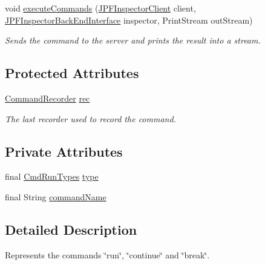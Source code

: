 \begin{DoxyCompactItemize}
void \hyperlink{interfacegov_1_1nasa_1_1jpf_1_1inspector_1_1client_1_1_client_command_interface_a6cf0905afd7822cee3268e286a7dcdd0}{execute\+Commands} (\hyperlink{classgov_1_1nasa_1_1jpf_1_1inspector_1_1client_1_1_j_p_f_inspector_client}{J\+P\+F\+Inspector\+Client} client, \hyperlink{interfacegov_1_1nasa_1_1jpf_1_1inspector_1_1interfaces_1_1_j_p_f_inspector_back_end_interface}{J\+P\+F\+Inspector\+Back\+End\+Interface} inspector, Print\+Stream out\+Stream)
\begin{DoxyCompactList}\small\item\em Sends the command to the server and prints the result into a stream. \end{DoxyCompactList}\end{DoxyCompactItemize}
\subsection*{Protected Attributes}
\begin{DoxyCompactItemize}
\item 
\hyperlink{classgov_1_1nasa_1_1jpf_1_1inspector_1_1client_1_1_command_recorder}{Command\+Recorder} \hyperlink{classgov_1_1nasa_1_1jpf_1_1inspector_1_1client_1_1_client_command_af4246f2427035c72a6af45a2c61361f7}{rec}
\begin{DoxyCompactList}\small\item\em The last recorder used to record the command. \end{DoxyCompactList}\end{DoxyCompactItemize}
\subsection*{Private Attributes}
\begin{DoxyCompactItemize}
\item 
final \hyperlink{enumgov_1_1nasa_1_1jpf_1_1inspector_1_1client_1_1commands_1_1_cmd_run_1_1_cmd_run_types}{Cmd\+Run\+Types} \hyperlink{classgov_1_1nasa_1_1jpf_1_1inspector_1_1client_1_1commands_1_1_cmd_run_ab15ead52f55e938e9d4b682e1ecbdf0e}{type}
\item 
final String \hyperlink{classgov_1_1nasa_1_1jpf_1_1inspector_1_1client_1_1commands_1_1_cmd_run_aed9e28e35b63746d9870c89ed0a37ac5}{command\+Name}
\end{DoxyCompactItemize}


\subsection{Detailed Description}
Represents the commands \char`\"{}run\char`\"{}, \char`\"{}continue\char`\"{} and \char`\"{}break\char`\"{}. 

